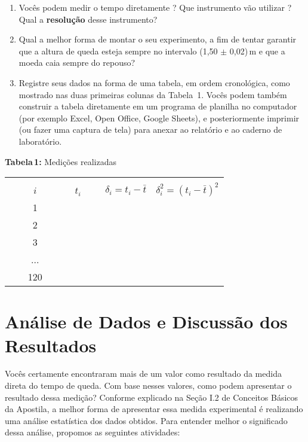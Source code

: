 \begin{enumerate}
\item Vocês podem medir o tempo diretamente ? Que instrumento vão utilizar ? Qual a {\bf resolução} desse instrumento?
\item Qual a melhor forma de montar o seu experimento, a fim de tentar garantir que a altura de queda esteja sempre no intervalo (1,50 $\pm$ 0,02)$\,$m e que a moeda caia sempre do repouso?

\item Registre seus dados na forma de uma tabela, em ordem cronológica, como mostrado nas duas primeiras colunas da Tabela~1. Vocês podem também construir a tabela diretamente em um programa de planilha no computador (por exemplo Excel, Open Office, Google Sheets), e posteriormente imprimir (ou fazer uma captura de tela) para anexar ao relatório e ao caderno de laboratório.

\end{enumerate}

\begin{center}
{{\bf Tabela\,1:} Medições realizadas}\vspace{0.2cm}

  \begin{tabular}[m]{ l | c | c | c | c |}
   \cline{2-5}
    &   & &  &  \\
    &  ~~~$i$~~~ & ~~~$t_i$~~~ & $\delta_i = t_i - \bar{t}$ & $\delta_i^2 = (t_i - \bar{t})^2$ \\\cline{2-5}
   & 1 & & & \\
   & 2 & & & \\
   & 3 & & & \\
   & ... & & & \\
    &  120& & &  \\ \cline{2-5}
  \end{tabular}
  \label{tab:Integ}
\end{center}


\section{Análise de Dados e Discussão dos Resultados}
Vocês certamente encontraram mais de um valor como resultado da medida direta do tempo de queda. Com base nesses valores, como podem apresentar o resultado dessa medição? Conforme explicado na Seção I.2 %
de  Conceitos Básicos da Apostila, a melhor forma de apresentar essa medida experimental é realizando uma análise estatística dos dados obtidos. Para entender melhor o significado dessa análise, propomos as seguintes atividades:

